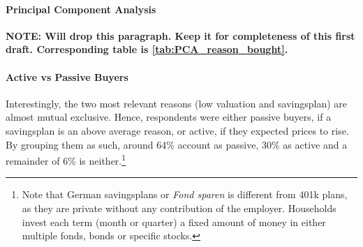 \documentclass[ProjectABM]{subfiles}
\begin{document}

\paragraph{Principal Component Analysis}
\textbf{NOTE: Will drop this paragraph. Keep it for completeness of this first draft. Corresponding table is \ref{tab:PCA_reason_bought}.}



\paragraph{Active vs Passive Buyers}
Interestingly, the two most relevant reasons (low valuation and savingsplan) are almost mutual exclusive. Hence, respondents were either passive buyers, if a savingsplan is an above average reason, or active, if they expected prices to rise. By grouping them as such, around 64\% account as passive, 30\% as active and a remainder of 6\% is neither.\footnote{Note that German savingsplans or \textit{Fond sparen} is different from 401k plans, as they are private without any contribution of the employer. Households invest each term (month or quarter) a fixed amount of money in either multiple fonds, bonds or specific stocks.}

\end{document}
